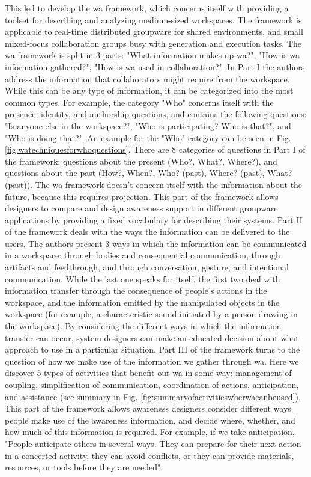 This led \cite{gutwin_descriptive_2002} to develop the \gls{wa} framework, which concerns itself with providing a toolset for describing and analyzing medium-sized workspaces. The framework is applicable to real-time distributed groupware for shared environments, and small mixed-focus collaboration groups busy with generation and execution tasks.
The \gls{wa} framework is split in 3 parts: "What information makes up \gls{wa}?", "How is \gls{wa} information gathered?", "How is \gls{wa} used in collaboration?". 
In Part I the authors address the information that collaborators might require from the workspace. While this can be any type of information, it can be categorized into the most common types. For example, the category "Who" concerns itself with the presence, identity, and authorship questions, and contains the following questions: "Is anyone else in the workspace?", "Who is participating? Who is that?", and "Who is doing that?". An example for the "Who" category can be seen in Fig. \ref{fig:watechniquesforwhoquestions}. There are 8 categories of questions in Part I of the framework: questions about the present (Who?, What?, Where?), and questions about the past (How?, When?, Who? (past), Where? (past), What? (past)). The \gls{wa} framework doesn't concern itself with the information about the future, because this requires projection.
This part of the framework allows designers to compare and design awareness support in different groupware applications by providing a fixed vocabulary for describing their systems.
Part II of the framework deals with the ways the information can be delivered to the users. The authors present 3 ways in which the information can be communicated in a workspace: through bodies and consequential communication, through artifacts and feedthrough, and through conversation, gesture, and intentional communication. While the last one speaks for itself, the first two deal with information transfer through the consequence of people's actions in the workspace, and the information emitted by the manipulated objects in the workspace (for example, a characteristic sound initiated by a person drawing in the workspace).
By considering the different ways in which the information transfer can occur, system designers can make an educated decision about what approach to use in a particular situation.
Part III of the framework turns to the question of how we make use of the information we gather through \gls{wa}. Here we discover 5 types of activities that benefit our \gls{wa} in some way: management of coupling, simplification of communication, coordination of actions, anticipation, and assistance (see summary in Fig. \ref{fig:summaryofactivitieswherwacanbeused}).
This part of the framework allows awareness designers consider different ways people make use of the awareness information, and decide where, whether, and how much of this information is required.
For example, if we take anticipation, "People anticipate others in several ways. They can prepare for their next action in a concerted activity, they can avoid conflicts, or they can provide materials, resources, or tools before they are needed".


